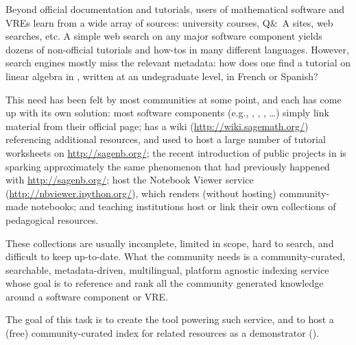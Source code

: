 \begin{workpackage}
\begin{tasklist}
\begin{task}[title=Demonstrator: Computational mathematics resources indexing service,
id=index-librorum-salvificorum,lead=UV,PM=2,partners={UB},wphases=20-25,issue=33] Beyond official documentation and
  tutorials, users of mathematical software and VREs learn from a wide
  array of sources: university courses, Q\&\ A sites, web searches,
  etc.  A simple web search on any major software component yields
  dozens of non-official tutorials and how-tos in many different
  languages. However, search engines mostly miss the relevant
  metadata: how does one find a tutorial on linear algebra in \PariGP,
  written at an undegraduate level, in French or Spanish?

This need has been felt by most communities at some point, and each
has come up with its own solution: most software components (e.g.,
\GAP, \PariGP, \Sage, \dots) simply link material from their official
page; \Sage has a wiki (\url{http://wiki.sagemath.org/}) referencing
additional resources, and used to host a large number of tutorial
worksheets on \url{http://sagenb.org/}; the recent introduction of
public projects in \SMC is sparking approximately the same phenomenon
that had previously happened with \url{http://sagenb.org/}; \IPython
host the Notebook Viewer service (\url{http://nbviewer.ipython.org/}),
which renders (without hosting) community-made notebooks; and teaching
institutions host or link their own collections of pedagogical
resources.

These collections are usually incomplete, limited in scope, hard to
search, and difficult to keep up-to-date.  What the community needs is a
community-curated, searchable, metadata-driven, multilingual, platform
agnostic indexing service whose goal is to reference and rank all the
community generated knowledge around a software component or VRE.

The goal of this task is to create the tool powering such service, and
to host a (free) community-curated index for \TheProject related
resources as a demonstrator ().

\end{task}




\end{tasklist}




\end{workpackage}
